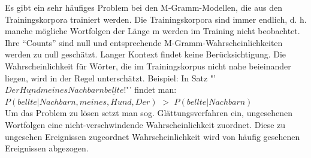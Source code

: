 Es gibt ein sehr h\"aufiges Problem bei den M-Gramm-Modellen, die aus den Trainingskorpora trainiert werden. Die Trainingskorpora sind immer endlich, d. h.  manche m\"ogliche Wortfolgen der L\"ange m werden im Training nicht beobachtet. Ihre "`Counts"' sind null und entsprechende M-Gramm-Wahrscheinlichkeiten werden zu null gesch\"atzt. Langer Kontext findet keine Ber\"ucksichtigung. Die Wahrscheinlichkeit f\"ur W\"orter, die im Trainingskorpus nicht nahe beieinander liegen, wird in der Regel untersch\"atzt. Beispiel: In Satz  "'$Der \underline{Hund} meines Nachbarn \underline{bellte}!$"'  findet man:\\ $P(bellte|Nachbarn, meines, Hund,Der)$ $>$ $P(bellte|Nachbarn)$\\
Um das Problem zu l\"osen setzt man sog. Gl\"attungsverfahren ein, ungesehenen Wortfolgen eine nicht-verschwindende Wahrscheinlichkeit zuordnet. Diese zu ungesehen Ereignissen zugeordnet Wahrscheinlichkeit wird von h\"aufig gesehenen Ereignissen abgezogen.
